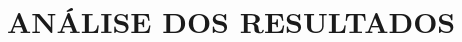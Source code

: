 \chapter[RESULTADOS] {ANÁLISE DOS RESULTADOS} \label{resultados}

\begin{comment}
       \subsection{Exemplo de Tabela}
    
    \begin{table}[h]
    \centering
    \caption{Título da Tabela} \label{rotulo}
    \begin{tabular}{l|r}
    \hline 
    Col1 & Col2 \\\hline
    $x_i$ & 555  \\ \hline
    \end{tabular}
    \end{table}
    
    \subsection{Exemplo de quadro}
    
    \begin{table}[htbp]
    \center
    \caption{Título da Tabela} \label{rotulo2}
    \begin{tabular}{l|r}
    \hline 
    Col1 & Col2 \\\hline
    $x_i$ & 555  \\ \hline
    \end{tabular}
    
    \end{table}
    
    
    
    
    \begin{quadro}[htbp]
    \caption{\label{quadro_exemplo}Exemplo de quadro}
    \begin{tabular}{|c|c|c|c|}
    	\hline
    	\textbf{Pessoa} & \textbf{Idade} & \textbf{Peso} & \textbf{Altura} \\ \hline
    	Marcos & 26    & 68   & 178    \\ \hline
    	Ivone  & 22    & 57   & 162    \\ \hline
    	...    & ...   & ...  & ...    \\ \hline
    	Sueli  & 40    & 65   & 153    \\ \hline
    \end{tabular}
    \fonte{Autor.}
    \end{quadro}
 
\end{comment}

